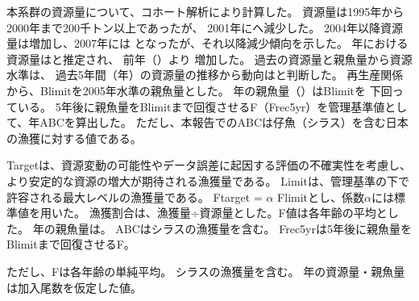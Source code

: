 {}
本系群の資源量について、コホート解析により計算した。
資源量は1995年から2000年まで200千トン以上であったが、
2001年に\makeatletter{}\makeatother へ減少した。
2004年以降資源量は増加し、2007年には\makeatletter{}\makeatother
となったが、それ以降減少傾向を示した。
{\ThisYr}年における資源量は\makeatletter{}\makeatother と推定され、
前年（\makeatletter{}\makeatother）より
増加した。%
過去の資源量と親魚量から資源水準は{\StockLevel}、
過去5年間（\makeatletter{}\makeatother {}年）の資源量の推移から動向は{\StockTrend}と判断した。
再生産関係から、Blimitを2005年水準の親魚量\makeatletter{}\makeatother とした。
{\ThisYr}年の親魚量（\makeatletter{}\makeatother）はBlimitを
下回っている。%
5年後に親魚量をBlimitまで回復させるF（Frec5yr）を管理基準値として、{\ABCYr}年ABCを算出した。
ただし、本報告でのABCは仔魚（シラス）を含む日本の漁獲に対する値である。



Targetは、資源変動の可能性やデータ誤差に起因する評価の不確実性を考慮し、
より安定的な資源の増大が期待される漁獲量である。
Limitは、管理基準の下で許容される最大レベルの漁獲量である。
Ftarget = $\alpha$ Flimitとし、係数$\alpha$には標準値{\Alpha}を用いた。
漁獲割合は、漁獲量÷資源量とした。F値は各年齢の平均とした。
{\ThisYr}年の親魚量は\makeatletter{}\makeatother。
ABCはシラスの漁獲量を含む。
Frec5yrは5年後に親魚量をBlimitまで回復させるF。


ただし、Fは各年齢の単純平均。
シラスの漁獲量を含む。
{\NextYr}年の資源量・親魚量は加入尾数を仮定した値。
